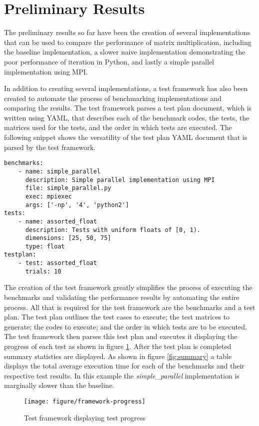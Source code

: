 \documentclass[oneside]{article}
\begin{document}
\section{Preliminary Results}

The preliminary results so far have been the creation of several implementations that can be used to compare the performance of matrix multiplication, including the baseline implementation, a slower naive implementation demonstrating the poor performance of iteration in Python, and lastly a simple parallel implementation using MPI.

In addition to creating several implementations, a test framework has also been created to automate the process of benchmarking implementations and comparing the results. The test framework parses a test plan document, which is written using YAML, that describes each of the benchmark codes, the tests, the matrices used for the tests, and the order in which tests are executed. The following snippet shows the versatility of the test plan YAML document that is parsed by the test framework.


\singlespacing
\begin{verbatim}
benchmarks:
    - name: simple_parallel
      description: Simple parallel implementation using MPI
      file: simple_parallel.py
      exec: mpiexec
      args: ['-np', '4', 'python2']
tests:
    - name: assorted_float
      description: Tests with uniform floats of [0, 1).
      dimensions: [25, 50, 75]
      type: float
testplan:
    - test: assorted_float
      trials: 10
\end{verbatim}


\doublespacing
The creation of the test framework greatly simplifies the process of executing the benchmarks and validating the performance results by automating the entire process. All that is required for the test framework are the benchmarks and a test plan. The test plan outlines the test cases to execute; the test matrices to generate; the codes to execute; and the order in which tests are to be executed. The test framework then parses this test plan and executes it displaying the progress of each test as shown in figure \ref{fig:progress}. After the test plan is completed summary statistics are displayed. As shown in figure \ref{fig:summary} a table displays the total average execution time for each of the benchmarks and their respective test results. In this example the \emph{simple\_parallel} implementation is marginally slower than the baseline.

\begin{figure}[ht!]
\centering
\texttt{[image: figure/framework-progress]}
\caption{Test framework displaying test progress}
\label{fig:progress}
\end{figure}
\end{document}
